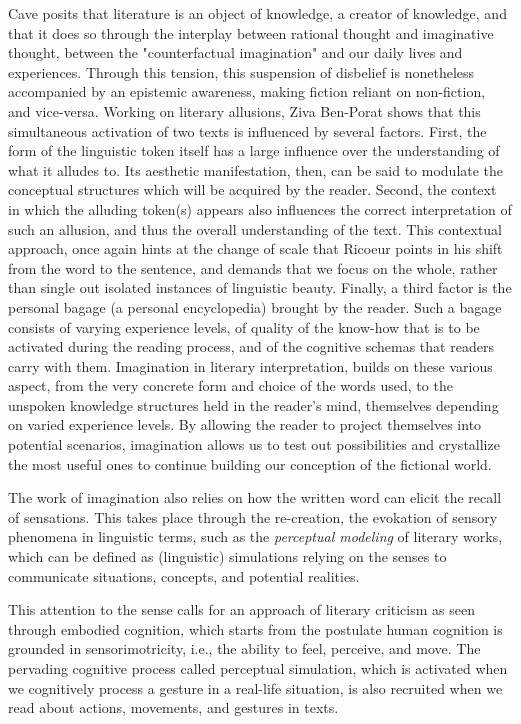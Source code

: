 Cave posits that literature is an object of knowledge, a creator of knowledge, and that it does so through the interplay between rational thought and imaginative thought, between the "counterfactual imagination" and our daily lives and experiences. Through this tension, this suspension of disbelief is nonetheless accompanied by an epistemic awareness, making fiction reliant on non-fiction, and vice-versa. Working on literary allusions, Ziva Ben-Porat shows that this simultaneous activation of two texts is influenced by several factors. First, the form of the linguistic token itself has a large influence over the understanding of what it alludes to. Its aesthetic manifestation, then, can be said to modulate the conceptual structures which will be acquired by the reader. Second, the context in which the alluding token(s) appears also influences the correct interpretation of such an allusion, and thus the overall understanding of the text. This contextual approach, once again hints at the change of scale that Ricoeur points in his shift from the word to the sentence, and demands that we focus on the whole, rather than single out isolated instances of linguistic beauty. Finally, a third factor is the personal bagage (a personal encyclopedia) brought by the reader. Such a bagage consists of varying experience levels, of quality of the know-how that is to be activated during the reading process, and of the cognitive schemas that readers carry with them. Imagination in literary interpretation, builds on these various aspect, from the very concrete form and choice of the words used, to the unspoken knowledge structures held in the reader's mind, themselves depending on varied experience levels. By allowing the reader to project themselves into potential scenarios, imagination allows us to test out possibilities and crystallize the most useful ones to continue building our conception of the fictional world.

The work of imagination also relies on how the written word can elicit the recall of sensations. This takes place through the re-creation, the evokation of sensory phenomena in linguistic terms, such as the \emph{perceptual modeling} of literary works, which can be defined as (linguistic) simulations relying on the senses to communicate situations, concepts, and potential realities.

This attention to the sense calls for an approach of literary criticism as seen through embodied cognition, which starts from the postulate human cognition is grounded in sensorimotricity, i.e., the ability to feel, perceive, and move. The pervading cognitive process called perceptual simulation, which is activated when we cognitively process a gesture in a real-life situation, is also recruited when we read about actions, movements, and gestures in texts.

